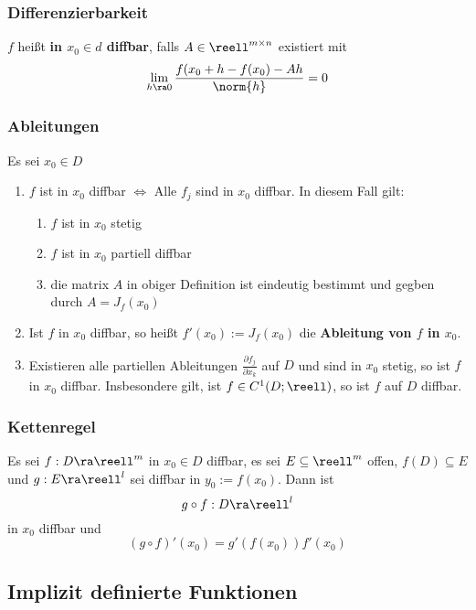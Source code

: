 \documentclass{kit}
\begin{document}
    \subsubsection{Differenzierbarkeit}
      $f$ heißt \textbf{in $x_0\in d$ diffbar}, falls $A\in\reell^{m\times n}$ existiert mit 
      $$\lim_{h\ra0}\frac{f(x_0+h-f(x_0)-Ah}{\norm{h}}=0$$
    \subsubsection{Ableitungen}
      Es sei $x_0\in D$
      \begin{enumerate}
        \item $f$ ist in $x_0$ diffbar $\Longleftrightarrow$ Alle $f_j$ sind in $x_0$ diffbar. In diesem Fall gilt:
          \begin{enumerate}[label=\roman*)]
              \item $f$ ist in $x_0$ stetig
              \item $f$ ist in $x_0$ partiell diffbar
              \item die matrix $A$ in obiger Definition ist eindeutig bestimmt und gegben durch $A=J_f(x_0)$
          \end{enumerate}
        \item Ist $f$ in $x_0$ diffbar, so heißt $f'(x_0):=J_f(x_0)$ die \textbf{Ableitung von $f$ in $x_0$}.
        \item Existieren alle partiellen Ableitungen $\frac{\partial f_j}{\partial x_k}$ auf $D$ und sind in $x_0$ stetig,
          so ist $f$ in $x_0$ diffbar. Insbesondere gilt, ist $f\in C^1(D;\reell)$, so ist $f$ auf $D$ diffbar.
      \end{enumerate}
    \subsubsection{Kettenregel}
      Es sei $f:D\ra\reell^m$ in $x_0\in D$ diffbar, es sei $E\subseteq\reell^m$ offen, $f(D)\subseteq E$ und 
      $g:E\ra\reell^l$ sei diffbar in $y_0:=f(x_0)$. Dann ist
      $$g\circ f:D\ra\reell^l$$
      in $x_0$ diffbar und
      $$(g\circ f)'(x_0)=g'(f(x_0))f'(x_0)$$
  \subsection{Implizit definierte Funktionen}
\end{document}
